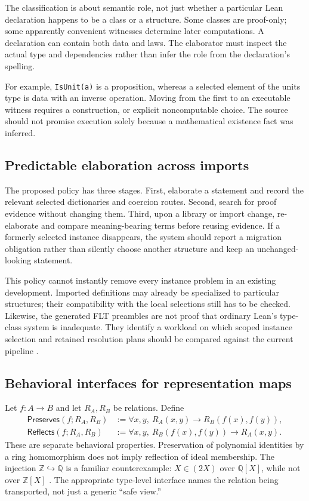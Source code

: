 \documentclass[11pt,a4paper]{article}
\theoremstyle{definition}
\theoremstyle{remark}
\newcommand{\code}[1]{\texttt{#1}}
\newcommand{\Q}{\mathbb Q}
\newcommand{\Z}{\mathbb Z}
\begin{document}
The classification is about semantic role, not just whether a particular Lean declaration happens to be a class or a structure. Some classes are proof-only; some apparently convenient witnesses determine later computations. A declaration can contain both data and laws. The elaborator must inspect the actual type and dependencies rather than infer the role from the declaration's spelling.

For example, \code{IsUnit(a)} is a proposition, whereas a selected element of the units type is data with an inverse operation. Moving from the first to an executable witness requires a construction, or explicit noncomputable choice. The source should not promise execution solely because a mathematical existence fact was inferred.

\subsection{Predictable elaboration across imports}
The proposed policy has three stages. First, elaborate a statement and record the relevant selected dictionaries and coercion routes. Second, search for proof evidence without changing them. Third, upon a library or import change, re-elaborate and compare meaning-bearing terms before reusing evidence. If a formerly selected instance disappears, the system should report a migration obligation rather than silently choose another structure and keep an unchanged-looking statement.

This policy cannot instantly remove every instance problem in an existing development. Imported definitions may already be specialized to particular structures; their compatibility with the local selections still has to be checked. Likewise, the generated FLT preambles are not proof that ordinary Lean's type-class system is inadequate. They identify a workload on which scoped instance selection and retained resolution plans should be compared against the current pipeline \cite{freyEnd}.

\subsection{Behavioral interfaces for representation maps}
Let $f:A\to B$ and let $R_A,R_B$ be relations. Define
\begin{align*}
 \mathsf{Preserves}(f;R_A,R_B)
   &:=\forall x,y,\ R_A(x,y)\to R_B(f(x),f(y)),\\
 \mathsf{Reflects}(f;R_A,R_B)
   &:=\forall x,y,\ R_B(f(x),f(y))\to R_A(x,y).
\end{align*}
These are separate behavioral properties. Preservation of polynomial identities by a ring homomorphism does not imply reflection of ideal membership. The injection $\Z\hookrightarrow\Q$ is a familiar counterexample: $X\in(2X)$ over $\Q[X]$, while not over $\Z[X]$ \cite{synA,synB}. The appropriate type-level interface names the relation being transported, not just a generic ``safe view.''
\end{document}
